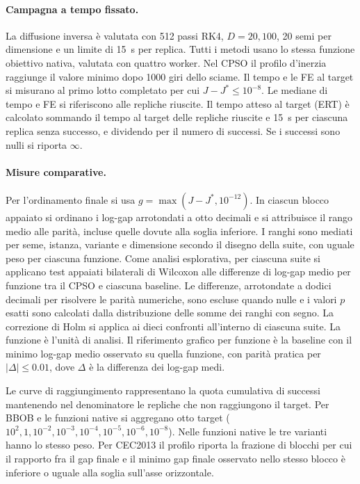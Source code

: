 \paragraph{Campagna a tempo fissato.}
La diffusione inversa è valutata con 512 passi RK4, $D=20,100$, 20 semi per dimensione e un limite di 15~s per replica. Tutti i metodi usano lo stessa funzione obiettivo nativa, valutata con quattro worker. Nel CPSO il profilo d'inerzia raggiunge il valore minimo dopo 1000 giri dello sciame. Il tempo e le FE al target si misurano al primo lotto completato per cui $J-J^*\leq10^{-8}$. Le mediane di tempo e FE si riferiscono alle repliche riuscite. Il tempo atteso al target (ERT) è calcolato sommando il tempo al target delle repliche riuscite e 15~s per ciascuna replica senza successo, e dividendo per il numero di successi. Se i successi sono nulli si riporta $\infty$.

\paragraph{Misure comparative.}
Per l'ordinamento finale si usa $g=\max(J-J^*,10^{-12})$. In ciascun blocco appaiato si ordinano i log-gap arrotondati a otto decimali e si attribuisce il rango medio alle parità, incluse quelle dovute alla soglia inferiore. I ranghi sono mediati per seme, istanza, variante e dimensione secondo il disegno della suite, con uguale peso per ciascuna funzione. Come analisi esplorativa, per ciascuna suite si applicano test appaiati bilaterali di Wilcoxon alle differenze di log-gap medio per funzione tra il CPSO e ciascuna baseline. Le differenze, arrotondate a dodici decimali per risolvere le parità numeriche, sono escluse quando nulle e i valori $p$ esatti sono calcolati dalla distribuzione delle somme dei ranghi con segno. La correzione di Holm si applica ai dieci confronti all'interno di ciascuna suite. La funzione è l'unità di analisi. Il riferimento grafico per funzione è la baseline con il minimo log-gap medio osservato su quella funzione, con parità pratica per $|\Delta|\leq0.01$, dove $\Delta$ è la differenza dei log-gap medi.

Le curve di raggiungimento rappresentano la quota cumulativa di successi mantenendo nel denominatore le repliche che non raggiungono il target. Per BBOB e le funzioni native si aggregano otto target ($10^2,1,10^{-2},10^{-3},10^{-4},10^{-5},10^{-6},10^{-8}$). Nelle funzioni native le tre varianti hanno lo stesso peso. Per CEC2013 il profilo riporta la frazione di blocchi per cui il rapporto fra il gap finale e il minimo gap finale osservato nello stesso blocco è inferiore o uguale alla soglia sull'asse orizzontale.

\endgroup
